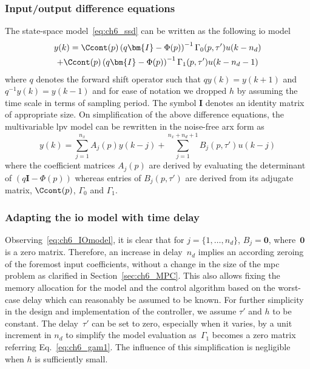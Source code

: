 \subsubsection{Input/output difference equations}\label{sec:ch6_iomodel}
The state-space model~\eqref{eq:ch6_ssd} can be written as the following \gls{io} model
\begin{multline*}
    y(k) = \Ccont (p) \left(q\bm{I}- \Phi(p)\right)^{-1} \Gamma_0(p,\tau') u(k-n_d) \\+ \Ccont (p) \left(q\bm{I}- \Phi(p)\right)^{-1}\Gamma_1(p,\tau') u(k-n_d-1)
\end{multline*}
where $q$ denotes the forward shift operator such that $qy(k) = y(k+1)$ and $q^{-1}y(k) = y(k-1)$ and for ease of notation we dropped $h$ by assuming the time scale in terms of sampling period. The symbol $\bm{I}$ denotes an identity matrix of appropriate size.
On simplification of the above difference equations, the multivariable \gls{lpv} model can be rewritten in the noise-free \gls{arx} form as
\begin{equation}\label{eq:ch6_IOmodel}
    y(k) = \sum_{j=1}^{n_x} A_j(p) y(k-j) + \sum_{j=1}^{n_x+n_d+1} B_j(p,\tau') u(k-j)
\end{equation}
where the coefficient matrices $A_j(p)$ are derived by evaluating the determinant of $\left(q\bm{I}-\Phi(p)\right)$ whereas entries of $B_j(p,\tau')$ are derived from its adjugate matrix, $\Ccont (p)$, $\Gamma_0$ and $\Gamma_1$.
\subsubsection{Adapting the \gls{io} model with time delay}\label{sec:ch6_adaptmodel}
Observing~\eqref{eq:ch6_IOmodel}, it is clear that for $j=\{1,\ldots,n_d\}$, $B_j=\bm{0}$, where~$\bm{0}$ is a zero matrix. Therefore, an increase in delay~$n_d$ implies an according zeroing of the foremost input coefficients, 
without a change in the size of the \gls{mpc} problem as clarified in Section~\ref{sec:ch6_MPC}. This also allows fixing the memory allocation for the model and the control algorithm based on the worst-case delay which can reasonably be assumed to be known.
For further simplicity in the design and implementation of the controller, we assume $\tau'$ and $h$ to be constant. The delay~$\tau'$ can be set to zero, especially when it varies, by a unit increment in $n_d$ to simplify the model evaluation as~$\Gamma_1$ becomes a zero matrix referring Eq.~\eqref{eq:ch6_gam1}. The influence of this simplification is negligible when $h$ is sufficiently small. 